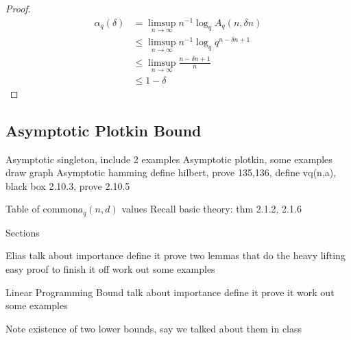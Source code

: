 \documentclass{article}
\theoremstyle{definition}
\numberwithin{exmp}{subsection}
\begin{document}
\begin{proof}
\begin{equation} 
\begin{split}
\alpha_{q}(\delta) & = \limsup_{n \to \infty} n^{-1} \log_q A_q(n,\delta n) \\
& \le \limsup_{n \to \infty} n^{-1} \log_q q^{n-\delta n+1} \\
& \le \limsup_{n \to \infty} \frac{n-\delta n+1}{n} \\
& \le 1 - \delta
\end{split}
\end{equation}
\end{proof}

\subsection{Asymptotic Plotkin Bound}



Asymptotic singleton, include 2 examples
Asymptotic plotkin, some examples
draw graph
Asymptotic hamming
	define hilbert, prove 135,136, define vq(n,a),
	black box 2.10.3, prove 2.10.5


Table of common$a_q(n,d)$ values
Recall basic theory: thm 2.1.2, 2.1.6

Sections


Elias
talk about importance
define it
prove two lemmas that do the heavy lifting
easy proof to finish it off
work out some examples

Linear Programming Bound
talk about importance
define it
prove it
work out some examples


Note existence of two lower bounds, say we talked about them in class
\end{document}
